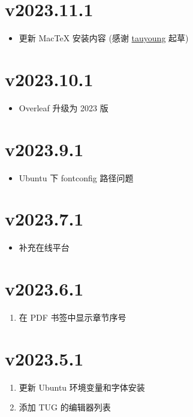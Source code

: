 \section*{v2023.11.1}

\begin{itemize}
  \item 更新 MacTeX 安装内容 (感谢 \href{https://github.com/tauyoungsama}{tauyoung} 起草)
\end{itemize}

\section*{v2023.10.1}

\begin{itemize}
  \item Overleaf 升级为 2023 版
\end{itemize}

\section*{v2023.9.1}

\begin{itemize}
  \item Ubuntu 下 fontconfig 路径问题
\end{itemize}

\section*{v2023.7.1}

\begin{itemize}
  \item 补充在线平台
\end{itemize}

\section*{v2023.6.1}

\begin{enumerate}
  \item 在 PDF 书签中显示章节序号
\end{enumerate}

\section*{v2023.5.1}

\begin{enumerate}
  \item 更新 Ubuntu 环境变量和字体安装
  \item 添加 TUG 的编辑器列表
\end{enumerate}

